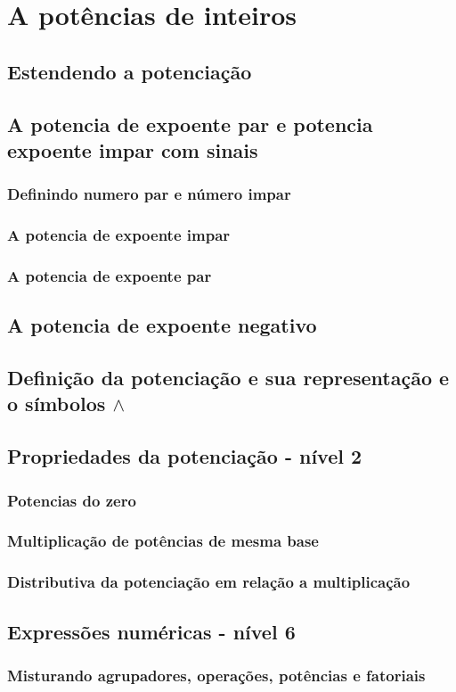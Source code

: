 \chapter[A potências de inteiros]{A potências de inteiros}

\section{Estendendo a potenciação}


\section{A potencia de expoente par e potencia expoente impar com sinais}
\subsection{Definindo numero par e número impar}

\subsection{A potencia de expoente impar}

\subsection{A potencia de expoente par}

\section{A potencia de expoente negativo}

\section{Definição da potenciação e sua representação e o símbolos $ \wedge $ }

\section{Propriedades da potenciação - nível 2}

\subsection{Potencias do zero}

\subsection{Multiplicação de potências de mesma base}

\subsection{Distributiva da potenciação em relação a multiplicação}

\section{Expressões numéricas - nível 6}

\subsection{Misturando agrupadores, operações, potências e fatoriais}

